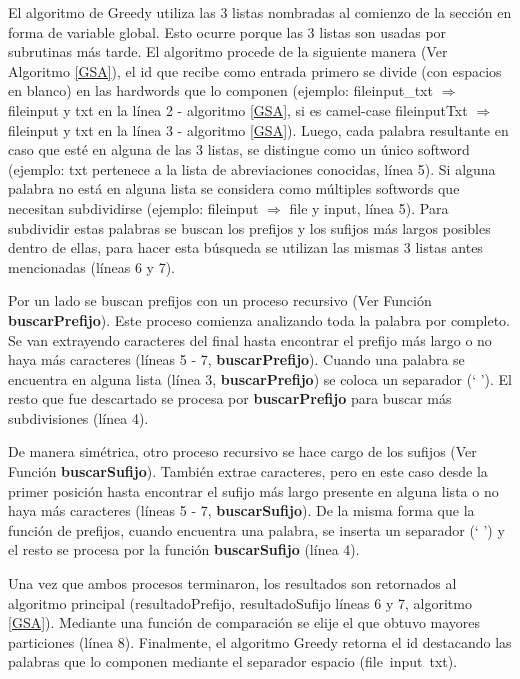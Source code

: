 El algoritmo de Greedy utiliza las 3 listas nombradas al comienzo de la sección en forma de variable global. Esto ocurre porque las 3 listas son usadas por subrutinas más tarde. El algoritmo procede de la siguiente manera (Ver Algoritmo \ref{GSA}), el id que recibe como entrada primero se divide (con espacios en blanco) en las hardwords que lo componen (ejemplo: \textsf{fileinput\_txt} $\Rightarrow$ \mbox{\textsf{fileinput}} y \textsf{txt} en la línea 2 - algoritmo \ref{GSA}, si es camel-case \textsf{fileinputTxt} $\Rightarrow$ \textsf{fileinput} y \textsf{txt} en la línea 3 - algoritmo \ref{GSA}). Luego, cada palabra resultante en caso que esté en alguna de las 3 listas, se distingue como un único softword (ejemplo: \textsf{txt} pertenece a la lista de abreviaciones conocidas, línea 5). Si alguna palabra no está en alguna lista se considera como múltiples softwords que necesitan subdividirse (ejemplo: \textsf{fileinput} $\Rightarrow$ \textsf{file} y \textsf{input}, línea 5).
Para subdividir estas palabras se buscan los prefijos y los sufijos más largos posibles dentro de ellas, para hacer esta búsqueda se utilizan las mismas 3 listas antes mencionadas (líneas 6 y 7).

Por un lado se buscan prefijos con un proceso recursivo (Ver Función \mbox{\textbf{buscarPrefijo}}). Este proceso comienza analizando toda la palabra por completo. Se van extrayendo caracteres del final hasta encontrar el prefijo más largo o no haya más caracteres (líneas 5 - 7, \textbf{buscarPrefijo}).
Cuando una palabra se encuentra en alguna lista (línea 3, \textbf{buscarPrefijo}) se coloca un separador (` '). El resto que fue descartado se procesa por \textbf{buscarPrefijo} para buscar más subdivisiones (línea 4).

De manera simétrica, otro proceso recursivo se hace cargo de los sufijos (Ver Función \textbf{buscarSufijo}). También extrae caracteres, pero en este caso desde la primer posición hasta encontrar el sufijo más largo presente en alguna lista o no haya más caracteres (líneas 5 - 7, \textbf{buscarSufijo}).
De la misma forma que la función de prefijos, cuando encuentra una palabra, se inserta un separador (` ') y el resto se procesa por la función \textbf{buscarSufijo} (línea 4).

Una vez que ambos procesos terminaron, los resultados son retornados al algoritmo principal (\textsf{resultadoPrefijo, resultadoSufijo} líneas 6 y 7, algoritmo \ref{GSA}). Mediante una función de comparación se elije el que obtuvo mayores particiones (línea 8). Finalmente, el algoritmo Greedy retorna el id destacando las palabras que lo componen mediante el separador espacio \mbox{(\textsf{file input txt})}.

